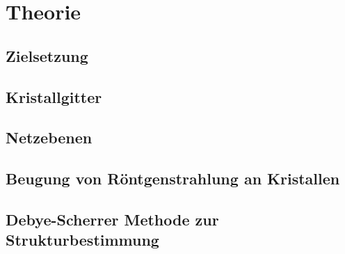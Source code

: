 \section{Theorie}
\label{sec:Theorie}

\subsection{Zielsetzung}
\label{subsec:Zielsetzung}

\subsection{Kristallgitter}
\label{subsec:kristallstrukturen}

\subsection{Netzebenen}
\label{subsec:netzebenen}

\subsection{Beugung von Röntgenstrahlung an Kristallen}
\label{subsec:Beugung}

\subsection{Debye-Scherrer Methode zur Strukturbestimmung}
\label{subsec:Methoden}

\cite{sample}
